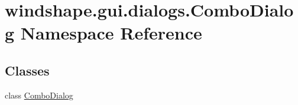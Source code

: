 \hypertarget{namespacewindshape_1_1gui_1_1dialogs_1_1_combo_dialog}{}\section{windshape.\+gui.\+dialogs.\+Combo\+Dialog Namespace Reference}
\label{namespacewindshape_1_1gui_1_1dialogs_1_1_combo_dialog}
\subsection*{Classes}
\begin{DoxyCompactItemize}
\item 
class \mbox{\hyperlink{classwindshape_1_1gui_1_1dialogs_1_1_combo_dialog_1_1_combo_dialog}{Combo\+Dialog}}
\end{DoxyCompactItemize}
